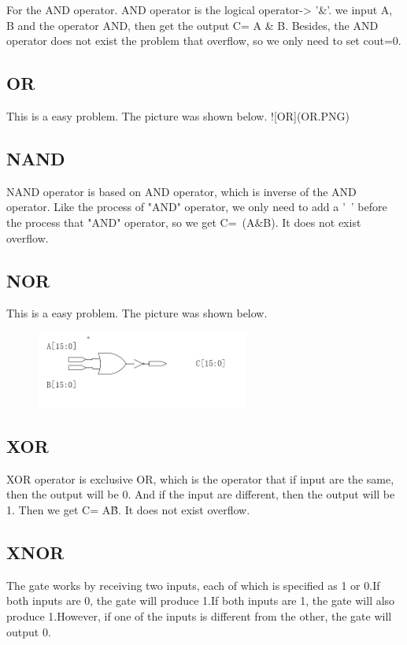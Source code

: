 \documentclass[12pt,a4paper]{article}
\begin{document}
For the AND operator.
AND operator is the logical operator-> '\&'.
we input A, B and the operator AND, then get the output C= A \& B. Besides, the AND operator does not exist the problem that overflow, so we only need to set cout=0.

\subsection{OR}

This is a easy problem.
The picture was shown below.
![OR](OR.PNG)

\subsection{NAND}

NAND operator is based on AND operator, which is inverse of the AND operator.
Like the process of "AND" operator, we only need to add a '~' before the process that "AND" operator, so we get C=~(A\&B).
It does not exist overflow.

\subsection{NOR}

This is a easy problem.
The picture was shown below.
\begin{figure}[H]
  \centering
  \includegraphics[height=1in]{NOR.PNG}
  \end{figure}

\subsection{XOR}

XOR operator is exclusive OR, which is the operator that if input are the same, then the output will be 0.
And if the input are different, then the output will be 1.
Then we get C= A\^B.
It does not exist overflow.

\subsection{XNOR}

The gate works by receiving two inputs, each of which is specified as 1 or 0.If both inputs are 0, the gate will produce 1.If both inputs are 1, the gate will also produce 1.However, if one of the inputs is different from the other, the gate will output 0.
\end{document}
